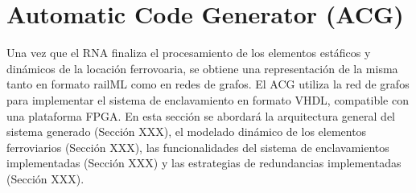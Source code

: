 \chapter{Automatic Code Generator (ACG)}
\label{sec:ACG}
    
    Una vez que el RNA finaliza el procesamiento de los elementos estáficos y dinámicos de la locación ferrovoaria, se obtiene una representación de la misma tanto en formato railML como en redes de grafos. El ACG utiliza la red de grafos para implementar el sistema de enclavamiento en formato VHDL, compatible con una plataforma FPGA. En esta sección se abordará la arquitectura general del sistema generado (Sección XXX), el modelado dinámico de los elementos ferroviarios (Sección XXX), las funcionalidades del sistema de enclavamientos implementadas (Sección XXX) y las estrategias de redundancias implementadas (Sección XXX).
    
     
        
    
    
